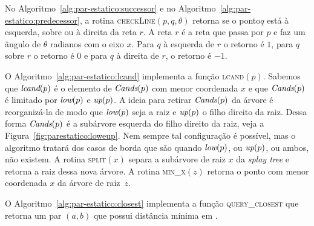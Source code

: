 No Algoritmo~\ref{alg:par-estatico:successor} e no Algoritmo~\ref{alg:par-estatico:predecessor}, a rotina
\textsc{checkLine}$(p, q, \theta)$ retorna se o ponto$q$ está à esquerda, sobre ou à direita da
reta $r$.
A reta $r$ é a reta que passa por $p$ e faz um ângulo de $\theta$ radianos com o eixo $x$.
Para $q$ à esquerda de $r$ o retorno é $1$, para $q$ sobre $r$ o retorno é $0$ e para $q$ à
direita de $r$, o retorno é $-1$.

O Algoritmo~\ref{alg:par-estatico:lcand} implementa a função \textsc{lcand}$(p)$.
Sabemos que $\textit{lcand}(p)$ é o elemento de $\textit{Cands}(p)$ com menor coordenada $x$ e que $\textit{Cands}(p)$ é
limitado por $\textit{low}(p)$ e $\textit{up}(p)$.
A ideia para retirar $\textit{Cands}(p)$ da árvore é reorganizá-la de modo que $\textit{low}(p)$ seja a raiz e
$\textit{up}(p)$ o filho direito da raiz.
Dessa forma $\textit{Cands}(p)$ é a subárvore esquerda do filho direito da raiz, veja a
Figura~\ref{fig:parestatico:loweup}.
Nem sempre tal configuração é possível, mas o algoritmo tratará dos casos de borda que são quando
$\textit{low}(p)$, ou $\textit{up}(p)$, ou ambos, não existem.
A rotina \textsc{split}$(x)$ separa a subárvore de raiz $x$ da \textit{splay tree} e retorna a
raiz dessa nova árvore.
A rotina \textsc{min\_x}$(z)$ retorna o ponto com menor coordenada $x$ da árvore de raiz~$z$.









O Algoritmo~\ref{alg:par-estatico:closest} implementa a função \textsc{query\_closest} que retorna um
par $(a,b)$ que possui distância mínima em \pontos.


